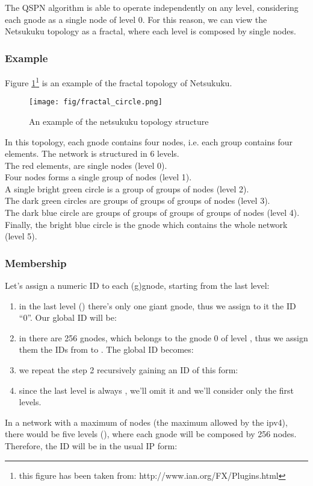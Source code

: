 \documentclass[a4paper]{article}
\newcommand{\href}[2]{ #1 }
\begin{document}
The QSPN algorithm is able to operate independently on any level,
considering each gnode as a single node of level 0.
For this reason, we can view the Netsukuku topology as a fractal, where each
level is composed by single nodes.

\subsubsection*{Example}

Figure \ref{fig:fract_circle}\footnote{this figure has been taken from:
\href{http://www.ian.org/FX/Plugins.html}{http://www.ian.org/FX/Plugins.html}}
is an example of the fractal topology of Netsukuku.

\begin{figure}[h]
	\begin{center}
		\texttt{[image: fig/fractal\_circle.png]}
	\end{center}
	\caption{An example of the netsukuku topology structure}
	\label{fig:fract_circle}
\end{figure}

In this topology, each gnode contains four nodes, i.e. each group contains
four elements. The network is structured in 6 levels.\\
The red elements, are single nodes (level 0).\\
Four nodes forms a single group of nodes (level 1).\\
A single bright green circle is a 
				  group of groups of nodes (level 2).\\
The dark green circles are        groups of groups of groups of nodes (level 3).\\
The dark blue circle are          groups of groups of groups of groups of
nodes (level 4). \\
Finally, the bright blue circle is the gnode which contains the whole network
(level 5).

\subsubsection{Membership}
Let's assign a numeric ID to each (g)gnode, starting from the last level:
\begin{enumerate}
	\item in the last level () there's only one giant gnode, thus we assign
		to it the ID ``0''. Our global ID will be:
		
	\item in  there are 256 gnodes, which belongs to the gnode 0 of
		level , thus we assign them the IDs from  to .
		The global ID becomes:
		
	\item we repeat the step 2 recursively gaining an ID of this form:
		
	\item since the last level is always , we'll omit it and we'll
		consider only the first  levels.
\end{enumerate}
In a network with a maximum of  nodes (the maximum allowed by the ipv4),
there would be five levels (), where each gnode will be composed by 256 nodes.
Therefore, the ID will be in the usual IP form:
\end{document}
